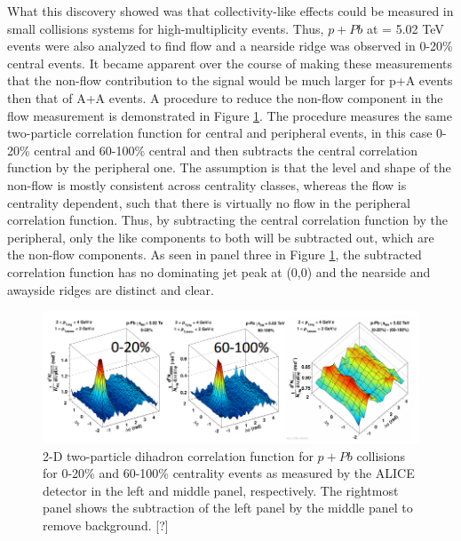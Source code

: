 What this discovery showed was that collectivity-like effects could be measured in small collisions systems for high-multiplicity events. Thus, $p+Pb$ at \sqsn = 5.02 TeV events were also analyzed to find flow and a nearside ridge was observed in 0-20\% central events. It became apparent over the course of making these measurements that the non-flow contribution to the signal would be much larger for p+A events then that of A+A events. A procedure to reduce the non-flow component in the flow measurement is demonstrated in Figure \ref{fig:pPb_ridge_subtraction}. The procedure measures the same two-particle correlation function for central and peripheral events, in this case 0-20\% central and 60-100\% central and then subtracts the central correlation function by the peripheral one. The assumption is that the level and shape of the non-flow is mostly consistent across centrality classes, whereas the flow is centrality dependent, such that there is virtually no flow in the peripheral correlation function. Thus, by subtracting the central correlation function by the peripheral, only the like components to both will be subtracted out, which are the non-flow components. As seen in panel three in Figure \ref{fig:pPb_ridge_subtraction}, the subtracted correlation function has no dominating jet peak at (0,0) and the nearside and awayside ridges are distinct and clear.

\begin{figure}[h!]
\begin{center}
\includegraphics[width=0.85\linewidth]{figs/pPb_subtraction_correlation.PNG}
\caption{ 2-D two-particle dihadron correlation function for $p+Pb$ collisions for 0-20\% and 60-100\% centrality events as measured by the ALICE detector in the left and middle panel, respectively. The rightmost panel shows the subtraction of the left panel by the middle panel to remove background. [?]}
\label{fig:pPb_ridge_subtraction}
\end{center}
\end{figure}

